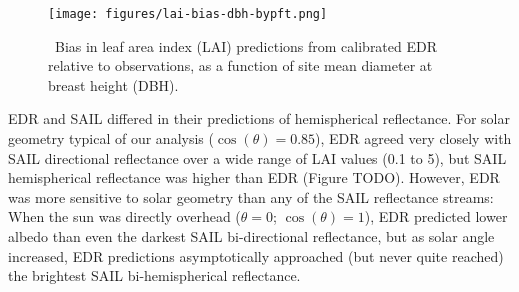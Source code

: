 \begin{figure}
  \centering
  \texttt{[image: figures/lai-bias-dbh-bypft.png]}
  \caption{\
    Bias in leaf area index (LAI) predictions from calibrated EDR relative to observations,
    as a function of site mean diameter at breast height (DBH).
  }
\end{figure}

EDR and SAIL differed in their predictions of hemispherical reflectance.
For solar geometry typical of our analysis ($\cos(\theta) = 0.85$), EDR agreed very closely with SAIL directional reflectance over a wide range of LAI values (0.1 to 5),
but SAIL hemispherical reflectance was higher than EDR (Figure TODO).
However, EDR was more sensitive to solar geometry than any of the SAIL reflectance streams:
When the sun was directly overhead ($\theta = 0$; $\cos(\theta) = 1$), EDR predicted lower albedo than even the darkest SAIL bi-directional reflectance, but as solar angle increased, EDR predictions asymptotically approached (but never quite reached) the brightest SAIL bi-hemispherical reflectance.
